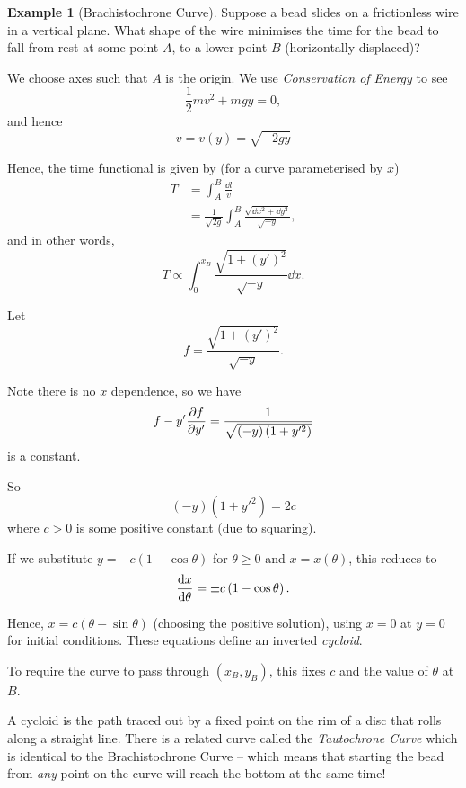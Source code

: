 \documentclass[11pt]{article}
\numberwithin{equation}{section}
\theoremstyle{definition}
\newtheorem{example}[theorem]{Example}
\theoremstyle{remark}
\newcommand{\pqty}[1]{\left(#1\right)}
\begin{document}
\begin{example}[Brachistochrone Curve]\label{variation-unit-0049}
    \label{ex:brachistochrone-curve}%
    Suppose a bead slides on a frictionless wire in a vertical plane. What shape of the wire minimises the time for the bead to fall from rest at some point \(A\), to a lower point \(B\) (horizontally displaced)?
    
    We choose axes such that \(A\) is the origin. We use \emph{Conservation of Energy} to see
    \[
        \frac{1}{2} m v^2 + m g y = 0,
    \]
    and hence
    \[
        v = v \pqty{y} = \sqrt{- 2 g y}
    \]

    Hence, the time functional is given by (for a curve parameterised by \(x\))
    \begin{align*}
        T &= \int_{A}^{B} \frac{\dd{l}}{v} \\
        &= \frac{1}{\sqrt{2g}} \int_{A}^{B} \frac{\sqrt{\dd{x}^2 + \dd{y}^2}}{\sqrt{-y}},
    \end{align*}
    and in other words,
    \[
        T \propto \int_{0}^{x_B} \frac{\sqrt{1 + \pqty{y'}^2}}{\sqrt{-y}} \dd{x}.
    \]

    Let
    \[
        f = \frac{\sqrt{1 + \pqty{y'}^2}}{\sqrt{-y}}.
    \]

    Note there is no \(x\) dependence, so we have
    \[
        f - y' \pdv{f}{y'} = \frac{1}{\sqrt{\pqty{-y} \pqty{1 + y'^2}}}
    \]
    is a constant.

    So
    \[
        \pqty{-y} \pqty{1 + y'^2} = 2c
    \]
    where \(c > 0\) is some positive constant (due to squaring).

    If we substitute \(y = -c \pqty{1 - \cos \theta}\) for \(\theta \geq 0\) and \(x = x \pqty{\theta}\), this reduces to
    \[
        \dv{x}{\theta} = \pm c \pqty{1 - \cos \theta}.
    \]
    
    Hence, \(x = c \pqty{\theta - \sin \theta}\) (choosing the positive solution), using \(x = 0\) at \(y = 0\) for initial conditions. These equations define an inverted \emph{cycloid}.

    To require the curve to pass through \(\pqty{x_B, y_B}\), this fixes \(c\) and the value of \(\theta\) at \(B\).
\end{example}

A cycloid is the path traced out by a fixed point on the rim of a disc that rolls along a straight line. There is a related curve called the \emph{Tautochrone Curve} which is identical to the Brachistochrone Curve -- which means that starting the bead from \emph{any} point on the curve will reach the bottom at the same time!
\end{document}
